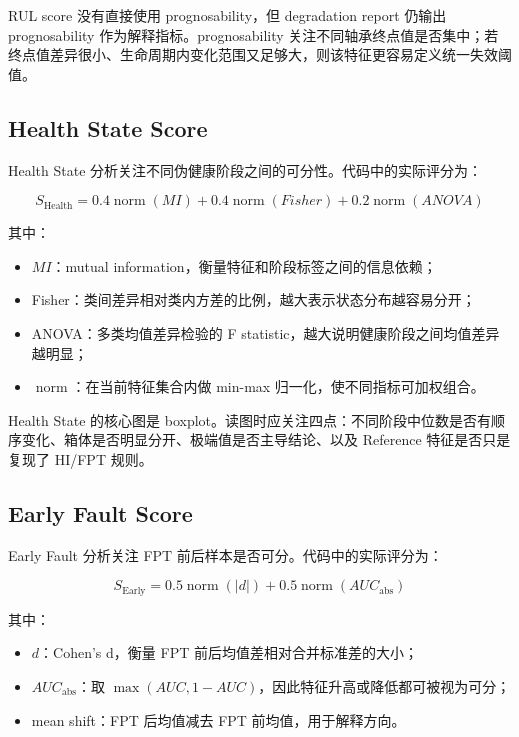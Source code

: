 RUL score 没有直接使用 prognosability，但 degradation report 仍输出 prognosability 作为解释指标。prognosability 关注不同轴承终点值是否集中；若终点值差异很小、生命周期内变化范围又足够大，则该特征更容易定义统一失效阈值。

\subsection{Health State Score}

Health State 分析关注不同伪健康阶段之间的可分性。代码中的实际评分为：

\[
S_{\mathrm{Health}} =
0.4\operatorname{norm}(MI)
+ 0.4\operatorname{norm}(Fisher)
+ 0.2\operatorname{norm}(ANOVA)
\]

其中：

\begin{itemize}[leftmargin=2em]
  \item \(MI\)：mutual information，衡量特征和阶段标签之间的信息依赖；
  \item Fisher：类间差异相对类内方差的比例，越大表示状态分布越容易分开；
  \item ANOVA：多类均值差异检验的 F statistic，越大说明健康阶段之间均值差异越明显；
  \item \(\operatorname{norm}\)：在当前特征集合内做 min-max 归一化，使不同指标可加权组合。
\end{itemize}

Health State 的核心图是 boxplot。读图时应关注四点：不同阶段中位数是否有顺序变化、箱体是否明显分开、极端值是否主导结论、以及 Reference 特征是否只是复现了 HI/FPT 规则。

\subsection{Early Fault Score}

Early Fault 分析关注 FPT 前后样本是否可分。代码中的实际评分为：

\[
S_{\mathrm{Early}} =
0.5\operatorname{norm}(|d|)
+ 0.5\operatorname{norm}(AUC_{\mathrm{abs}})
\]

其中：

\begin{itemize}[leftmargin=2em]
  \item \(d\)：Cohen's d，衡量 FPT 前后均值差相对合并标准差的大小；
  \item \(AUC_{\mathrm{abs}}\)：取 \(\max(AUC, 1-AUC)\)，因此特征升高或降低都可被视为可分；
  \item mean shift：FPT 后均值减去 FPT 前均值，用于解释方向。
\end{itemize}


